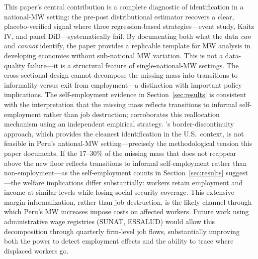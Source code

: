 \documentclass[12pt]{article}
\begin{document}
This paper's central contribution is a complete diagnostic of identification in a national-MW setting: the pre-post distributional estimator recovers a clear, placebo-verified signal where three regression-based strategies---event study, Kaitz IV, and panel DiD---systematically fail. By documenting both what the data \textit{can} and \textit{cannot} identify, the paper provides a replicable template for MW analysis in developing economies without sub-national MW variation. This is not a data-quality failure---it is a structural feature of single-national-MW settings. The cross-sectional design cannot decompose the missing mass into transitions to informality versus exit from employment---a distinction with important policy implications. The self-employment evidence in Section~\ref{sec:results} is consistent with the interpretation that the missing mass reflects transitions to informal self-employment rather than job destruction; \citet{corcuera2024} corroborates this reallocation mechanism using an independent empirical strategy. \citet{dube2010}'s border-discontinuity approach, which provides the cleanest identification in the U.S.\ context, is not feasible in Peru's national-MW setting---precisely the methodological tension this paper documents. If the 17--30\% of the missing mass that does not reappear above the new floor reflects transitions to informal self-employment rather than non-employment---as the self-employment counts in Section~\ref{sec:results} suggest---the welfare implications differ substantially: workers retain employment and income at similar levels while losing social security coverage. This extensive-margin informalization, rather than job destruction, is the likely channel through which Peru's MW increases impose costs on affected workers. Future work using administrative wage registries (SUNAT, ESSALUD) would allow this decomposition through quarterly firm-level job flows, substantially improving both the power to detect employment effects and the ability to trace where displaced workers go.

\newpage


\end{document}
